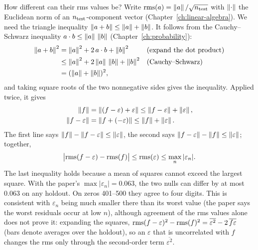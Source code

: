 How different can their rms values be? Write $\mathrm{rms}(a)=\left\lVert a\right\rVert/\sqrt{n_{\rm test}}$ with $\left\lVert \cdot\right\rVert$ the Euclidean norm of an $n_{\rm test}$-component vector (Chapter~\ref{ch:linear-algebra}). We need the triangle inequality $\left\lVert a+b\right\rVert\le\left\lVert a\right\rVert+\left\lVert b\right\rVert$. It follows from the Cauchy--Schwarz inequality $a\cdot b\le\left\lVert a\right\rVert\,\left\lVert b\right\rVert$ (Chapter~\ref{ch:probability}):
\begin{align}
\left\lVert a+b\right\rVert^2&=\left\lVert a\right\rVert^2+2\,a\cdot b+\left\lVert b\right\rVert^2 &&\text{(expand the dot product)}\nonumber\\
&\le\left\lVert a\right\rVert^2+2\left\lVert a\right\rVert\,\left\lVert b\right\rVert+\left\lVert b\right\rVert^2 &&\text{(Cauchy--Schwarz)}\nonumber\\
&=(\left\lVert a\right\rVert+\left\lVert b\right\rVert)^2,\nonumber
\end{align}
and taking square roots of the two nonnegative sides gives the inequality. Applied twice, it gives
\begin{align}
\left\lVert f\right\rVert&=\left\lVert (f-\varepsilon)+\varepsilon\right\rVert\le\left\lVert f-\varepsilon\right\rVert+\left\lVert \varepsilon\right\rVert,\nonumber\\
\left\lVert f-\varepsilon\right\rVert&=\left\lVert f+(-\varepsilon)\right\rVert\le\left\lVert f\right\rVert+\left\lVert \varepsilon\right\rVert.\nonumber
\end{align}
The first line says $\left\lVert f\right\rVert-\left\lVert f-\varepsilon\right\rVert\le\left\lVert \varepsilon\right\rVert$, the second says $\left\lVert f-\varepsilon\right\rVert-\left\lVert f\right\rVert\le\left\lVert \varepsilon\right\rVert$; together,
\begin{equation}
\bigl|\mathrm{rms}(f-\varepsilon)-\mathrm{rms}(f)\bigr|\le\mathrm{rms}(\varepsilon)\le\max_n|\varepsilon_n| .
\label{eq:paper-setup-rmsbound}
\end{equation}
The last inequality holds because a mean of squares cannot exceed the largest square. With the paper's $\max|\varepsilon_n|=0.063$, the two nulls can differ by at most $0.063$ on any holdout. On zeros 401--500 they agree to four digits. This is consistent with $\varepsilon_n$ being much smaller there than its worst value (the paper says the worst residuals occur at low $n$), although agreement of the rms values alone does not prove it: expanding the squares, $\mathrm{rms}(f-\varepsilon)^2-\mathrm{rms}(f)^2=\overline{\varepsilon^2}-2\,\overline{f\varepsilon}$ (bars denote averages over the holdout), so an $\varepsilon$ that is uncorrelated with $f$ changes the rms only through the second-order term $\overline{\varepsilon^2}$.


